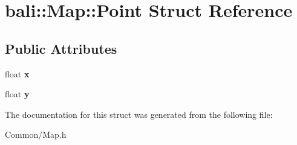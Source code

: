 \hypertarget{structbali_1_1_map_1_1_point}{\section{bali\-:\-:Map\-:\-:Point Struct Reference}
\label{structbali_1_1_map_1_1_point}
}
\subsection*{Public Attributes}
\begin{DoxyCompactItemize}
\item 
\hypertarget{structbali_1_1_map_1_1_point_a4ba9fe56987b3446153a287f47af8ebc}{float {\bfseries x}}\label{structbali_1_1_map_1_1_point_a4ba9fe56987b3446153a287f47af8ebc}

\item 
\hypertarget{structbali_1_1_map_1_1_point_a2c8e86a13f8326646ef89d43562348e3}{float {\bfseries y}}\label{structbali_1_1_map_1_1_point_a2c8e86a13f8326646ef89d43562348e3}

\end{DoxyCompactItemize}


The documentation for this struct was generated from the following file\-:\begin{DoxyCompactItemize}
\item 
Common/Map.\-h\end{DoxyCompactItemize}
